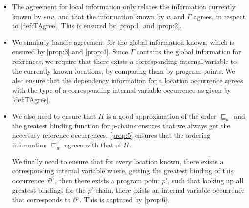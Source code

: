 \documentclass{llncs}
\newcommand{\sqleq}{\ensuremath{\sqsubseteq\xspace}}
\begin{document}
\begin{itemize}
	\item The agreement for local information only relates the information currently known by $env$, and that the information known by $w$ and $\Gamma$ agrees, in respect to \cref{def:TAgree}.
		This is ensured by \eqref{prop:1} and \eqref{prop:2}.

	\item We similarly handle agreement for the global information
          known, which is ensured by \eqref{prop:3} and
          \eqref{prop:4}. 
		Since $\Gamma$ contains the global information for
                references, we require that there exists a
                corresponding internal variable to the currently known
                locations, by comparing them by program points. 
		We also ensure that the dependency information for a location
                occurrence agrees with the type of a corresponding
                internal variable occurrence as given by \cref{def:TAgree}. 

	\item We also need to ensure that $\Pi$ is a good
          approximation of the order $\sqleq_w$ and the greatest
          binding function for $p$-chains ensures that we always get
          the necessary reference occurrences. 
	\eqref{prop:5} ensures that the ordering information
        $\sqleq_w$ agrees with that of $\Pi$.

	We finally need to ensure that for every location
        known, there exists a corresponding internal variable
        where, getting the greatest binding of this occurrence,
        $\ell^p$, then there exists a program point $p'$, such that
        looking up all greatest bindings for the $p'$-chain, there
        exists an internal variable occurrence that corresponds to
        $\ell^p$. This is captured by \eqref{prop:6}.
\end{itemize}



\end{document}
